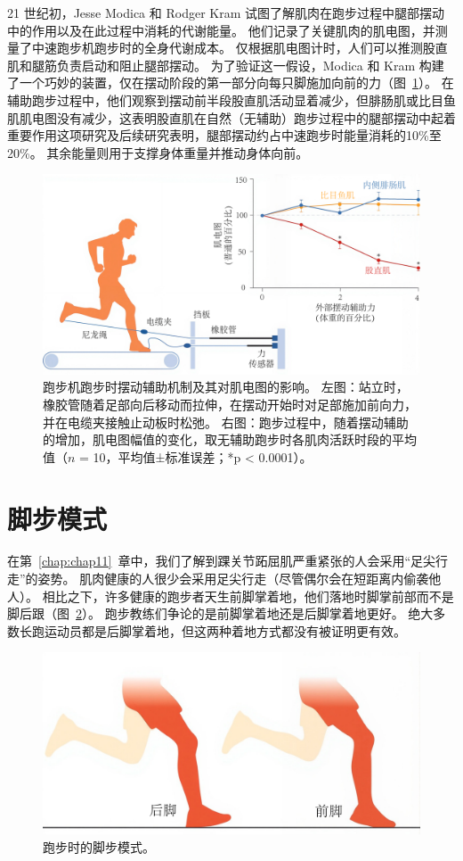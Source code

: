 21 世纪初，Jesse Modica 和 Rodger Kram 试图了解肌肉在跑步过程中腿部摆动中的作用以及在此过程中消耗的代谢能量。
他们记录了关键肌肉的肌电图，并测量了中速跑步机跑步时的全身代谢成本。
仅根据肌电图计时，人们可以推测股直肌和腿筋负责启动和阻止腿部摆动。
为了验证这一假设，Modica 和 Kram 构建了一个巧妙的装置，仅在摆动阶段的第一部分向每只脚施加向前的力（图~\ref{fig:12_8}）。
在辅助跑步过程中，他们观察到摆动前半段股直肌活动显着减少，但腓肠肌或比目鱼肌肌电图没有减少，这表明股直肌在自然（无辅助）跑步过程中的腿部摆动中起着重要作用这项研究及后续研究表明，腿部摆动约占中速跑步时能量消耗的10\%至20\%。
其余能量则用于支撑身体重量并推动身体向前。

\begin{figure}[!htb]
	\centering
	\includegraphics[width=1.0\linewidth]{chap12/12_8}
	\caption{跑步机跑步时摆动辅助机制及其对肌电图的影响。
		左图：站立时，橡胶管随着足部向后移动而拉伸，在摆动开始时对足部施加前向力，并在电缆夹接触止动板时松弛。
		右图：跑步过程中，随着摆动辅助的增加，肌电图幅值的变化，取无辅助跑步时各肌肉活跃时段的平均值（$n$ = 10，平均值±标准误差；*p < 0.0001）\cite{modica2005metabolic}。 \label{fig:12_8}}
\end{figure}



\section{脚步模式}

在第~\ref{chap:chap11}~章中，我们了解到踝关节跖屈肌严重紧张的人会采用“足尖行走”的姿势。
肌肉健康的人很少会采用足尖行走（尽管偶尔会在短距离内偷袭他人）。
相比之下，许多健康的跑步者天生前脚掌着地，他们落地时脚掌前部而不是脚后跟（图~\ref{fig:12_9}）。
跑步教练们争论的是前脚掌着地还是后脚掌着地更好。
绝大多数长跑运动员都是后脚掌着地，但这两种着地方式都没有被证明更有效。


\begin{figure}[!htb]
	\centering
	\includegraphics[width=0.5\linewidth]{chap12/12_9}
	\caption{跑步时的脚步模式。 \label{fig:12_9}}
\end{figure}


